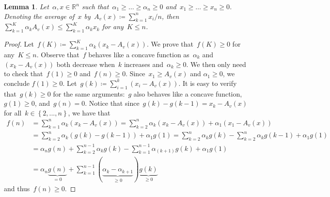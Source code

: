 \documentclass[10pt,a4paper]{amsart}
\newcommand{\R}{\mathds{R}}
\newcommand{\define}{\coloneqq}
\newcommand{\brackets}[1]{\left\{ #1 \right\}}
\newtheorem{lemma}[theorem]{Lemma}
\theoremstyle{definition}
\begin{document}
\begin{lemma}
  \label{rmk:weighted-average-dom}
  Let~$\alpha, x\in \R^n$ such that~$\alpha_1 \geq \dots \geq \alpha_{n} \geq 0$ and~$x_1 \geq \dots \geq x_{n} \geq 0$.
  Denoting the average of~$x$ by~$A_v(x)\define \sum^n_{k=1} x_i/n$, then $\sum_{k=1}^K \alpha_k A_v(x) \leq \sum_{k=1}^K \alpha_k x_k$ for any~$K\leq n$.
\end{lemma}
\begin{proof}
  Let~$f(K)\coloneq \sum_{k=1}^K \alpha_k (x_k - A_v(x))$. 
  We prove that~$f(K)\geq 0$ for any~$K\leq n$.
  Observe that~$f$ behaves like a concave function as~$\alpha_k$ and~$(x_k - A_v(x))$ both decrease when~$k$ increases and~$\alpha_k \geq 0$.
  We then only need to check that~$f(1) \geq 0$ and~$f(n)\geq 0$.
  Since~$x_1 \geq A_v(x)$ and $\alpha_1 \geq 0$, we conclude $f(1) \geq 0$.
  Let~$g(k)\coloneqq \sum_{i=1}^k (x_i - A_v(x))$.
  It is easy to verify that~$g(k)\geq 0$ for the same arguments:~$g$ also behaves like a  concave function, $g(1)\geq 0$, and~$g(n) = 0$.
  Notice that since~$g(k) - g(k-1) = x_k - A_v(x)$ for all~$k\in \brackets{2, ..., n}$, we have that
  \begin{align*}
    f(n)
    &= \sum_{k = 1}^n \alpha_k(x_k - A_v(x)) = \sum_{k = 2}^n \alpha_k(x_k - A_v(x)) + \alpha_1 (x_1 - A_v(x)) \\
    &= \sum_{k=2}^{n} \alpha_k (g(k) - g(k-1)) + \alpha_1 g(1) = \sum_{k=2}^{n} \alpha_k g(k) - \sum_{k=2}^{n} \alpha_k g(k-1) + \alpha_1 g(1) \\
    &= \alpha_n g(n) + \sum_{k=2}^{n-1} \alpha_k g(k) - \sum_{k=1}^{n-1} \alpha_{(k+1)} g(k) + \alpha_1 g(1) \\
    &= \alpha_n \underbrace{g(n)}_{=0} + \sum_{k = 1}^{n-1} (\underbrace{\alpha_k - \alpha_{k+1}}_{\geq 0}) \underbrace{g(k)}_{\geq 0} 
  \end{align*}
  and thus~$f(n) \geq 0$.
\end{proof}
\end{document}

